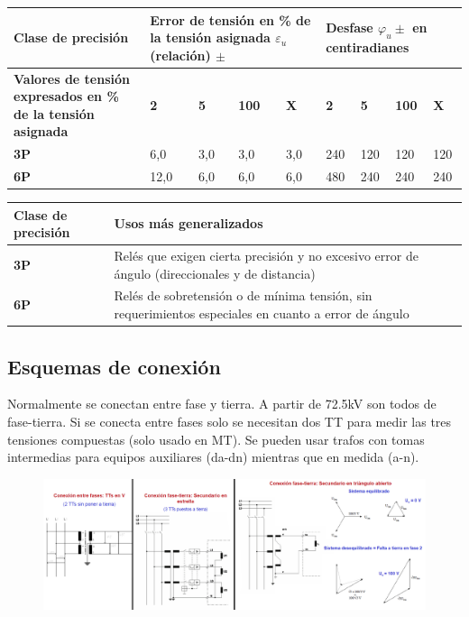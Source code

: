 \begin{itemize}
\begin{itemize}
		\begin{table}[H]
			\centering
			\begin{tabular}{|p{5cm}|p{1cm}|p{1cm}|p{1cm}|p{1cm}|p{1cm}|p{1cm}|p{1cm}|p{1cm}|}
				\hline
				\textbf{Clase de precisión} & \multicolumn{4}{p{4cm}|}{\centering \textbf{Error de tensión en \% de la tensión asignada $\varepsilon_u$ (relación) $\pm$}} & \multicolumn{4}{p{4cm}|}{\centering \textbf{Desfase $\varphi_u \pm$} en centiradianes} \\ \hline
				\textbf{Valores de tensión expresados en \% de la tensión asignada} & \textbf{2} & \textbf{5} & \textbf{100} & \textbf{X} & \textbf{2} & \textbf{5} & \textbf{100} & \textbf{X} \\ \hline
				\textbf{3P} & 6,0 & 3,0 & 3,0 & 3,0 & 240 & 120 & 120 & 120 \\ \hline
				\textbf{6P} & 12,0 & 6,0 & 6,0 & 6,0 & 480 & 240 & 240 & 240 \\ \hline
			\end{tabular}
			\label{tab:errores_tension}
		\end{table}
		\begin{table}[H]
			\centering
			\begin{tabular}{|p{4cm}|p{10cm}|}
				\hline
				\textbf{Clase de precisión} & \textbf{Usos más generalizados} \\ \hline
				\textbf{3P} & Relés que exigen cierta precisión y no excesivo error de ángulo (direccionales y de distancia) \\ \hline
				\textbf{6P} & Relés de sobretensión o de mínima tensión, sin requerimientos especiales en cuanto a error de ángulo \\ \hline
			\end{tabular}
			\label{tab:usos_precision}
		\end{table}
	\end{itemize}
\end{itemize}
\subsection{Esquemas de conexión}
Normalmente se conectan entre fase y tierra. A partir de 72.5kV son todos de fase-tierra. Si se conecta entre fases solo se necesitan dos TT para medir las tres tensiones compuestas (solo usado en MT). Se pueden usar trafos con tomas intermedias para equipos auxiliares (da-dn) mientras que en medida (a-n).
\begin{figure}[H]
	\centering
	\includegraphics[width=1\linewidth]{Images/51}
	\label{fig:51}
\end{figure}

